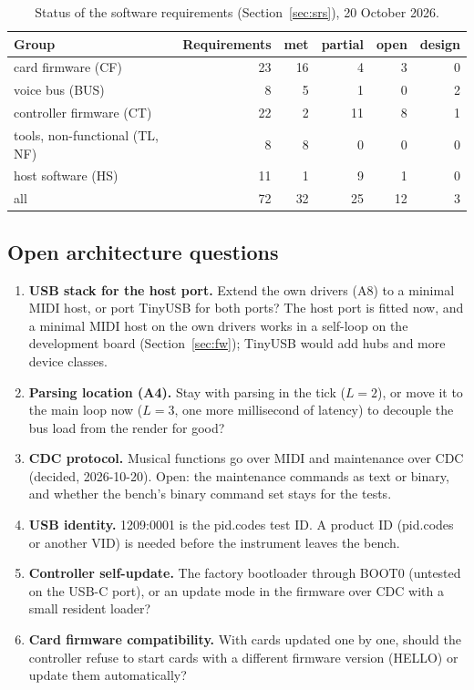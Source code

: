 \begin{table}[htbp]
\centering\small
\caption{Status of the software requirements (Section~\ref{sec:srs}), 20 October 2026.}\label{tab:srssum}
\begin{tabular}{@{}l r r r r r@{}}
\toprule
Group & Requirements & met & partial & open & design \\
\midrule
card firmware (CF) & 23 & 16 & 4 & 3 & 0 \\
voice bus (BUS) & 8 & 5 & 1 & 0 & 2 \\
controller firmware (CT) & 22 & 2 & 11 & 8 & 1 \\
tools, non-functional (TL, NF) & 8 & 8 & 0 & 0 & 0 \\
host software (HS) & 11 & 1 & 9 & 1 & 0 \\
\midrule
all & 72 & 32 & 25 & 12 & 3 \\
\bottomrule
\end{tabular}
\end{table}

\subsection{Open architecture questions}\label{sec:sadopen}

\begin{enumerate}
  \item \textbf{USB stack for the host port.} Extend the own drivers (A8) to a minimal MIDI host, or port TinyUSB
    for both ports? The host port is fitted now, and a minimal MIDI host on the own drivers works in a self-loop on
    the development board (Section~\ref{sec:fw}); TinyUSB would add hubs and more device classes.
  \item \textbf{Parsing location (A4).} Stay with parsing in the tick ($L = 2$), or move it to the main loop now
    ($L = 3$, one more millisecond of latency) to decouple the bus load from the render for good?
  \item \textbf{CDC protocol.} Musical functions go over MIDI and maintenance over CDC (decided, 2026-10-20). Open:
    the maintenance commands as text or binary, and whether the bench's binary command set stays for the tests.
  \item \textbf{USB identity.} 1209:0001 is the pid.codes test ID. A product ID (pid.codes or another VID) is
    needed before the instrument leaves the bench.
  \item \textbf{Controller self-update.} The factory bootloader through BOOT0 (untested on the USB-C port), or an
    update mode in the firmware over CDC with a small resident loader?
  \item \textbf{Card firmware compatibility.} With cards updated one by one, should the controller refuse to start
    cards with a different firmware version (HELLO) or update them automatically?
\end{enumerate}
